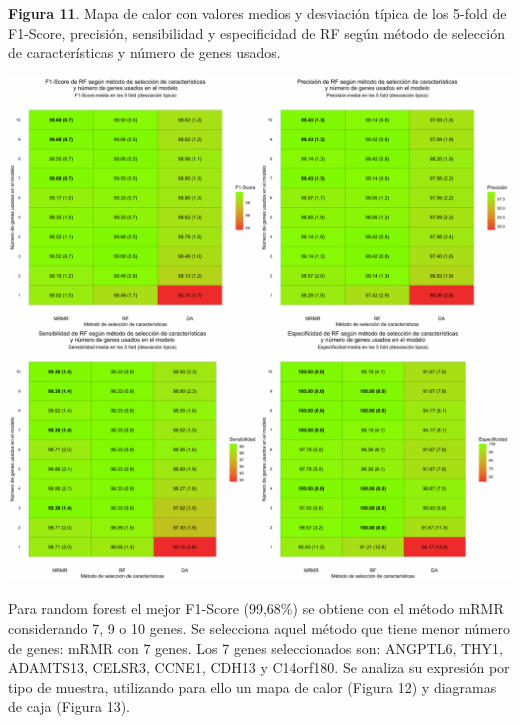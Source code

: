 \textbf{Figura 11}. Mapa de calor con valores medios y desviación típica de los 5-fold de F1-Score, precisión, sensibilidad y especificidad de RF según método de selección de características y número de genes usados.
\begin{center}
	\includegraphics[width=1\textwidth]{figuras/11_higado_biclase_heatmap_rf.pdf} 
\end{center}

Para random forest el mejor F1-Score (99,68\%) se obtiene con el método mRMR considerando 7, 9 o 10 genes. Se selecciona aquel método que tiene menor número de genes: mRMR con 7 genes. Los 7 genes seleccionados son: ANGPTL6, THY1, ADAMTS13, CELSR3, CCNE1, CDH13 y C14orf180. Se analiza su expresión por tipo de muestra, utilizando para ello un mapa de calor (Figura 12) y diagramas de caja (Figura 13).\\


